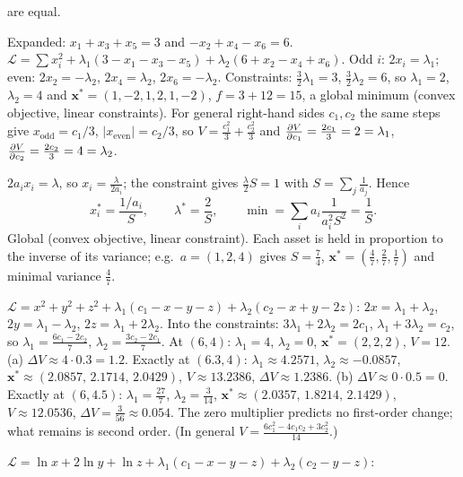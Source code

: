 \begin{solutions}
        are equal.
  \item Expanded: $x_1+x_3+x_5=3$ and $-x_2+x_4-x_6=6$.
        $\mathcal{L}=\sum x_i^{2}+\lambda_1(3-x_1-x_3-x_5)+\lambda_2(6+x_2-x_4+x_6)$.
        Odd $i$: $2x_i=\lambda_1$; even: $2x_2=-\lambda_2$,
        $2x_4=\lambda_2$, $2x_6=-\lambda_2$. Constraints:
        $\tfrac32\lambda_1=3$, $\tfrac32\lambda_2=6$, so $\lambda_1=2$,
        $\lambda_2=4$ and $\mathbf{x}^*=(1,-2,1,2,1,-2)$, $f=3+12=15$, a
        global minimum (convex objective, linear constraints). For general
        right-hand sides $c_1,c_2$ the same steps give $x_{\text{odd}}=c_1/3$,
        $|x_{\text{even}}|=c_2/3$, so $V=\tfrac{c_1^{2}}3+\tfrac{c_2^{2}}3$ and
        $\frac{\partial V}{\partial c_1}=\tfrac{2c_1}3=2=\lambda_1$,
        $\frac{\partial V}{\partial c_2}=\tfrac{2c_2}3=4=\lambda_2$. \checkmark
  \item $2a_ix_i=\lambda$, so $x_i=\tfrac{\lambda}{2a_i}$; the constraint
        gives $\tfrac\lambda2S=1$ with $S=\sum_j\tfrac1{a_j}$. Hence
        \[
          x_i^*=\frac{1/a_i}{S},\qquad \lambda^*=\frac2S,\qquad
          \min=\sum_ia_i\frac{1}{a_i^{2}S^{2}}=\frac1S .
        \]
        Global (convex objective, linear constraint). Each asset is held in
        proportion to the inverse of its variance; e.g.\ $a=(1,2,4)$ gives
        $S=\tfrac74$, $\mathbf{x}^*=(\tfrac47,\tfrac27,\tfrac17)$ and minimal
        variance $\tfrac47$.
  \item $\mathcal{L}=x^{2}+y^{2}+z^{2}+\lambda_1(c_1-x-y-z)+\lambda_2(c_2-x+y-2z)$:
        $2x=\lambda_1+\lambda_2$, $2y=\lambda_1-\lambda_2$,
        $2z=\lambda_1+2\lambda_2$. Into the constraints:
        $3\lambda_1+2\lambda_2=2c_1$, $\lambda_1+3\lambda_2=c_2$, so
        $\lambda_1=\tfrac{6c_1-2c_2}{7}$, $\lambda_2=\tfrac{3c_2-2c_1}{7}$. At
        $(6,4)$: $\lambda_1=4$, $\lambda_2=0$, $\mathbf{x}^*=(2,2,2)$, $V=12$.
        (a) $\Delta V\approx4\cdot0.3=1.2$. Exactly at $(6.3,4)$:
        $\lambda_1\approx4.2571$, $\lambda_2\approx-0.0857$,
        $\mathbf{x}^*\approx(2.0857,\,2.1714,\,2.0429)$, $V\approx13.2386$,
        $\Delta V\approx1.2386$. (b) $\Delta V\approx0\cdot0.5=0$. Exactly
        at $(6,4.5)$: $\lambda_1=\tfrac{27}7$, $\lambda_2=\tfrac3{14}$,
        $\mathbf{x}^*\approx(2.0357,\,1.8214,\,2.1429)$, $V\approx12.0536$,
        $\Delta V=\tfrac3{56}\approx0.054$. The zero multiplier predicts no
        first-order change; what remains is second order. (In general
        $V=\tfrac{6c_1^{2}-4c_1c_2+3c_2^{2}}{14}$.)
  \item $\mathcal{L}=\ln x+2\ln y+\ln z+\lambda_1(c_1-x-y-z)+\lambda_2(c_2-y-z)$:

\end{solutions}
